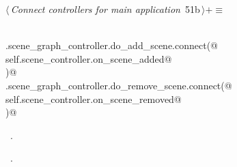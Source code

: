 \documentclass[
    a4paper,      %
    10pt,         %
    openright,    %
    notitlepage,  %
    parskip=half, %
]{scrreprt}       %
\theoremstyle{definition}                    %
\begin{document}
\begin{flushleft} \small
\begin{minipage}{\linewidth}\label{scrap77}\raggedright\small
{} $\langle\,${\itshape Connect controllers for main application}\nobreak\ {\footnotesize {51b}}$\,\rangle+\equiv$
\vspace{-1ex}
\begin{list}{}{} \item
\mbox{}\lstinline@@\\
\mbox{}\lstinline@self.scene_graph_controller.do_add_scene.connect(@\\
\mbox{}\lstinline@    self.scene_controller.on_scene_added@\\
\mbox{}\lstinline@)@\\
\mbox{}\lstinline@self.scene_graph_controller.do_remove_scene.connect(@\\
\mbox{}\lstinline@    self.scene_controller.on_scene_removed@\\
\mbox{}\lstinline@)@{\NWsep}
\end{list}
\vspace{-1.5ex}
\footnotesize
\begin{list}{}{\setlength{\itemsep}{-\parsep}\setlength{\itemindent}{-\leftmargin}}
\item \NWtxtMacroDefBy\ .
\item \NWtxtMacroRefIn\ .

\item{}
\end{list}
\end{minipage}\vspace{4ex}
\end{flushleft}
\end{document}
